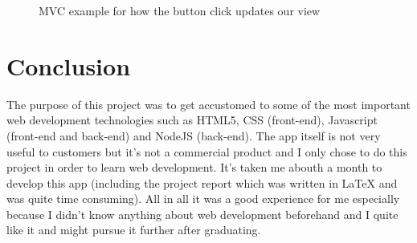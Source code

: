 \documentclass[12pt]{article} %
\begin{document}
	\begin{figure}[H] %
	\caption{MVC example for how the button click updates our view}
	\label{MVC)}
	\end{figure}

	

		

\section{Conclusion} %

\noindent The purpose of this project was to get accustomed to some of the most important web development technologies such as HTML5, CSS (front-end), 
Javascript (front-end and back-end) and NodeJS (back-end). The app itself is not very useful to customers but it's not a commercial product and I only chose to do this project
in order to learn web development. 
It's taken me abouth a month to develop this app (including the project report which was written in LaTeX and was quite time consuming). All in all it was a good experience for me especially because I didn't know anything about web development beforehand and I quite like it and might pursue it further after graduating.
\end{document}
